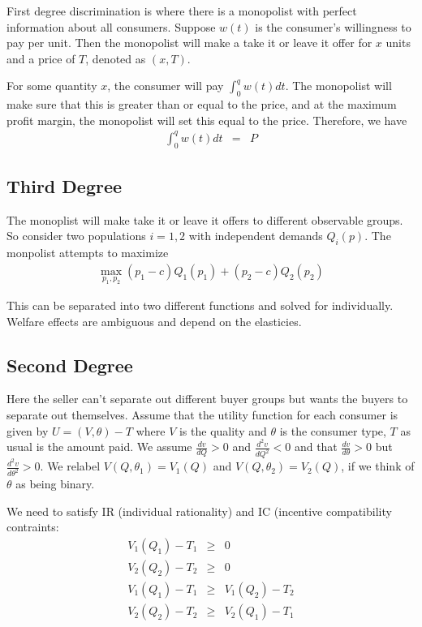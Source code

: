 \documentclass[12pt]{article}
\begin{document}
First degree discrimination is where there is a monopolist with perfect information about all consumers. Suppose $w(t)$ is the consumer's willingness to pay per unit. Then the monopolist will make a take it or leave it offer for $x$ units and a price of $T$, denoted as $(x,T)$.

For some quantity $x$, the consumer will pay $\int_0^q w(t) dt$. The monopolist will make sure that this is greater than or equal to the price, and at the maximum profit margin, the monopolist will set this equal to the price. Therefore, we have
\begin{eqnarray}
\int_0^q w(t) dt &=& P
\end{eqnarray}

\subsection{Third Degree}

The monoplist will make take it or leave it offers to different observable groups. So consider two populations $i=1,2$ with independent demands $Q_i(p)$. The monpolist attempts to maximize
\begin{eqnarray}
\max_{p_1, p_2} (p_1 - c) Q_1(p_1) + (p_2 - c) Q_2(p_2)
\end{eqnarray}

This can be separated into two different functions and solved for individually. Welfare effects are ambiguous and depend on the elasticies. 

\subsection{Second Degree}

Here the seller can't separate out different buyer groups but wants the buyers to separate out themselves. Assume that the utility function for each consumer is given by $U = (V, \theta) - T$ where $V$ is the quality and $\theta$ is the consumer type, $T$ as usual is the amount paid. We assume $\frac{dv}{dQ} > 0$ and $\frac{d^2 v}{d Q^2} < 0$ and that $\frac{dv}{d \theta} > 0$ but $\frac{d^2 v}{d \theta^2} > 0$. We relabel $V(Q, \theta_1) = V_1(Q)$ and $V(Q, \theta_2) = V_2(Q)$, if we think of $\theta$ as being binary.

We need to satisfy IR (individual rationality) and IC (incentive compatibility contraints:
\begin{eqnarray}
V_1(Q_1) - T_1 &\geq& 0 \\
V_2(Q_2) - T_2 &\geq& 0 \\
V_1(Q_1) - T_1 &\geq& V_1(Q_2) - T_2 \\
V_2(Q_2) - T_2 &\geq& V_2(Q_1) - T_1
\end{eqnarray}
\end{document}
